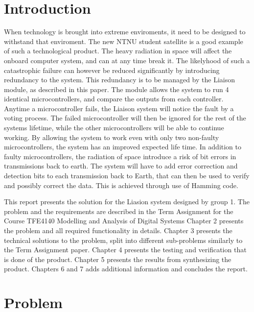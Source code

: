 \documentclass[a4paper]{IEEEtran}
\begin{document}
\begin{titlepage}
    \tableofcontents
\end{titlepage}

\clearpage

\section{Introduction}
When technology is brought into extreme enviroments, it need to be designed to withstand that enviroment.
The new NTNU student satellite is a good example of such a technological product.
The heavy radiation in space will affect the onboard computer system, and can at any time break it.
The likelyhood of such a catastrophic failure can however be reduced significantly by introducing redundancy to the system.
This redundancy is to be managed by the Liaison module, as described in this paper.
The module allows the system to run 4 identical microcontrollers, and compare the outputs from each controller.
Anytime a microcontroller fails, the Liaison system will notice the fault by a voting process.
The failed microcontroller will then be ignored for the rest of the systems lifetime, while the other microcontrollers will be able to continue working.
By allowing the system to work even with only two non-faulty microcontrollers, the system has an improved expected life time.
In addition to faulty microcontrollers, the radiation of space introduce a risk of bit errors in transmissions back to earth.
The system will have to add error correction and detection bits to each transmission back to Earth, that can then be used to verify and possibly correct the data.
This is achieved through use of Hamming code.

This report presents the solution for the Liasion system designed by group 1. The problem and the requirements are described in the Term Assignment\protect\cite{assignment-text} for the Course TFE4140 Modelling and Analysis of Digital Systems
Chapter 2 presents the problem and all required functionality in details.
Chapter 3 presents the technical solutions to the problem, split into different sub-problems similarly to the Term Assignment paper\protect\cite{assignment-text}.
Chapter 4 presents the testing and verification that is done of the product.
Chapter 5 presents the results from synthesizing the product.
Chapters 6 and 7 adds additional information and concludes the report.

\section{Problem}
\end{document}
